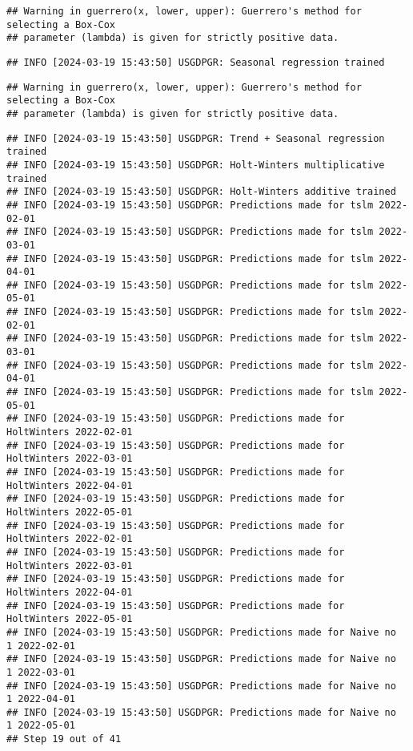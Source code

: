\documentclass[
]{article}
\begin{document}
\begin{verbatim}
## Warning in guerrero(x, lower, upper): Guerrero's method for selecting a Box-Cox
## parameter (lambda) is given for strictly positive data.
\end{verbatim}

\begin{verbatim}
## INFO [2024-03-19 15:43:50] USGDPGR: Seasonal regression trained
\end{verbatim}

\begin{verbatim}
## Warning in guerrero(x, lower, upper): Guerrero's method for selecting a Box-Cox
## parameter (lambda) is given for strictly positive data.
\end{verbatim}

\begin{verbatim}
## INFO [2024-03-19 15:43:50] USGDPGR: Trend + Seasonal regression trained
## INFO [2024-03-19 15:43:50] USGDPGR: Holt-Winters multiplicative trained
## INFO [2024-03-19 15:43:50] USGDPGR: Holt-Winters additive trained
## INFO [2024-03-19 15:43:50] USGDPGR: Predictions made for tslm 2022-02-01
## INFO [2024-03-19 15:43:50] USGDPGR: Predictions made for tslm 2022-03-01
## INFO [2024-03-19 15:43:50] USGDPGR: Predictions made for tslm 2022-04-01
## INFO [2024-03-19 15:43:50] USGDPGR: Predictions made for tslm 2022-05-01
## INFO [2024-03-19 15:43:50] USGDPGR: Predictions made for tslm 2022-02-01
## INFO [2024-03-19 15:43:50] USGDPGR: Predictions made for tslm 2022-03-01
## INFO [2024-03-19 15:43:50] USGDPGR: Predictions made for tslm 2022-04-01
## INFO [2024-03-19 15:43:50] USGDPGR: Predictions made for tslm 2022-05-01
## INFO [2024-03-19 15:43:50] USGDPGR: Predictions made for HoltWinters 2022-02-01
## INFO [2024-03-19 15:43:50] USGDPGR: Predictions made for HoltWinters 2022-03-01
## INFO [2024-03-19 15:43:50] USGDPGR: Predictions made for HoltWinters 2022-04-01
## INFO [2024-03-19 15:43:50] USGDPGR: Predictions made for HoltWinters 2022-05-01
## INFO [2024-03-19 15:43:50] USGDPGR: Predictions made for HoltWinters 2022-02-01
## INFO [2024-03-19 15:43:50] USGDPGR: Predictions made for HoltWinters 2022-03-01
## INFO [2024-03-19 15:43:50] USGDPGR: Predictions made for HoltWinters 2022-04-01
## INFO [2024-03-19 15:43:50] USGDPGR: Predictions made for HoltWinters 2022-05-01
## INFO [2024-03-19 15:43:50] USGDPGR: Predictions made for Naive no  1 2022-02-01
## INFO [2024-03-19 15:43:50] USGDPGR: Predictions made for Naive no  1 2022-03-01
## INFO [2024-03-19 15:43:50] USGDPGR: Predictions made for Naive no  1 2022-04-01
## INFO [2024-03-19 15:43:50] USGDPGR: Predictions made for Naive no  1 2022-05-01
## Step 19 out of 41
\end{verbatim}
\end{document}
